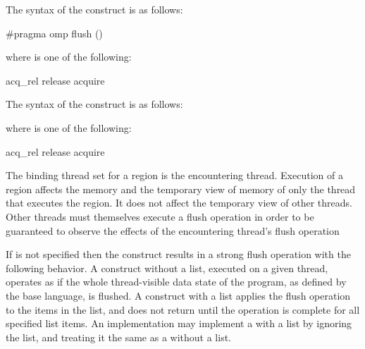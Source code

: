 \syntax
\begin{ccppspecific}
The syntax of the  construct is as follows:

\begin{ompcPragma}
#pragma omp flush  \plc{[}()\plc{] new-line}
\end{ompcPragma}
\begin{samepage}
where  is one of the following:

\begin{indentedcodelist}
acq_rel
release
acquire
\end{indentedcodelist}
\end{samepage}
\end{ccppspecific}

\begin{fortranspecific}
The syntax of the  construct is as follows:

\begin{samepage}
where  is one of the following:

\begin{indentedcodelist}
acq_rel
release
acquire
\end{indentedcodelist}
\end{samepage}
\end{fortranspecific}

\binding
The binding thread set for a  region is the encountering thread. Execution of a
 region affects the memory and the temporary view of memory of only the thread
that executes the region. It does not affect the temporary view of other threads. Other
threads must themselves execute a flush operation in order to be guaranteed to observe
the effects of the encountering thread's flush operation

\descr
If  is not specified then the  construct
results in a strong flush operation with the following behavior. A 
construct without a list, executed on a given thread, operates as if the whole
thread-visible data state of the program, as defined by the base language, is
flushed. A  construct with a list applies the flush operation to
the items in the list, and does not return until the operation is complete for
all specified list items. An implementation may implement a  with
a list by ignoring the list, and treating it the same as a 
without a list.

